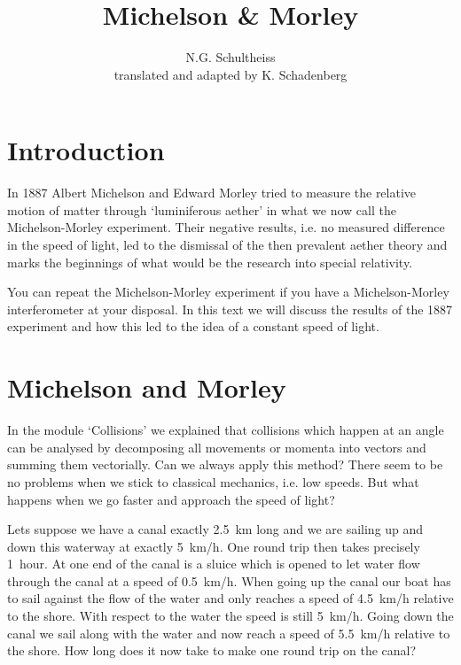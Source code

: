 


\author{N.G. Schultheiss \\ translated and adapted by K. Schadenberg}
\date{}
\title{Michelson \& Morley}



\maketitle

\section{Introduction}
In 1887 Albert Michelson and Edward Morley tried to measure the relative motion of matter through `luminiferous aether' in what we now call the Michelson-Morley experiment. Their negative results, i.e. no measured difference in the speed of light, led to the dismissal of the then prevalent aether theory and marks the beginnings of what would be the research into special relativity.

You can repeat the Michelson-Morley experiment if you have a Michelson-Morley interferometer at your disposal. In this text we will discuss the results of the 1887 experiment and how this led to the idea of a constant speed of light.

\section{Michelson and Morley}
In the module `Collisions' we explained that collisions which happen at an angle can be analysed by decomposing all movements or momenta into vectors and summing them vectorially. Can we always apply this method? There seem to be no problems when we stick to classical mechanics, i.e. low speeds. But what happens when we go faster and approach the speed of light?

Lets suppose we have a canal exactly 2.5~km long and we are sailing up and down this waterway at exactly 5~km/h. One round trip then takes precisely 1~hour. At one end of the canal is a sluice which is opened to let water flow through the canal at a speed of 0.5~km/h. When going up the canal our boat has to sail against the flow of the water and only reaches a speed of 4.5~km/h relative to the shore. With respect to the water the speed is still 5~km/h. Going down the canal we sail along with the water and now reach a speed of 5.5~km/h relative to the shore. How long does it now take to make one round trip on the canal?

